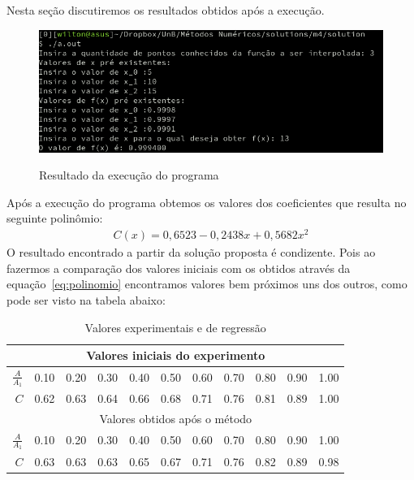 \documentclass[12pt, hidelinks]{article}
\begin{document}
Nesta seção discutiremos os resultados obtidos após a execução.

\begin{figure}[!h]
  \centering
  \includegraphics[width=15cm]{figuras/p13.png}\\
  \caption{Resultado da execução do programa}\label{fig:printx}
\end{figure}
Após a execução do programa obtemos os valores dos coeficientes que resulta no seguinte polinômio:
\begin{eqnarray}\label{eq:polinomio}
  C(x) = 0,6523 - 0,2438x + 0,5682x^2
\end{eqnarray}
O resultado encontrado a partir da solução proposta é condizente. Pois ao fazermos a comparação dos valores iniciais com os obtidos através da equação~\eqref{eq:polinomio} encontramos valores bem próximos uns dos outros, como pode ser visto na tabela abaixo:

\begin{table}[h]
  \centering
  \vspace{0.5cm}
  \begin{tabular}{|r|r|r|r|r|r|r|r|r|r|r|}
    \hline
    \multicolumn{11}{|c|}{Valores iniciais do experimento} \\
    \hline
      $\frac{A}{A_1}$ & 0.10 & 0.20 & 0.30 & 0.40 & 0.50 & 0.60 & 0.70 & 0.80 & 0.90 & 1.00\\
    \hline
      $C$ & 0.62 & 0.63 & 0.64 & 0.66 & 0.68 & 0.71 & 0.76 & 0.81 & 0.89 & 1.00\\
    \hline
    \multicolumn{11}{|c|}{Valores obtidos após o método} \\
    \hline
      $\frac{A}{A_1}$ & 0.10 & 0.20 & 0.30 & 0.40 & 0.50 & 0.60 & 0.70 & 0.80 & 0.90 & 1.00\\
    \hline
      $C$ & 0.63 & 0.63 & 0.63 & 0.65 & 0.67 & 0.71 & 0.76 & 0.82 & 0.89 & 0.98\\
    \hline
  \end{tabular}
  \caption{Valores experimentais e de regressão}
\end{table}
\end{document}
